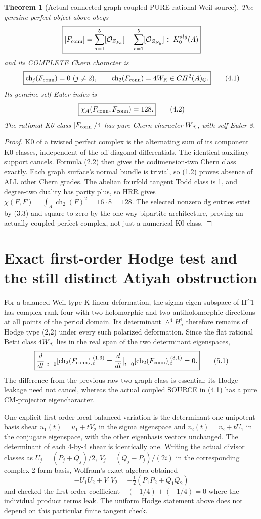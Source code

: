 \documentclass[11pt,a4paper]{article}
\newcommand{\Q}{\mathbb Q}
\newcommand{\ch}{\operatorname{ch}}
\newtheorem{theorem}{Theorem}[section]
\begin{document}
\begin{theorem}[Actual connected graph-coupled PURE rational Weil source]
The genuine perfect object above obeys
\[
 \boxed{
 [F_{\rm conn}]
 =\sum_{a=1}^5[\mathcal O_{Z_{P_a}}]
  -\sum_{b=1}^5[\mathcal O_{Z_{N_b}}]
             \in K_0^{alg}(A)
 }
\]
and its COMPLETE Chern character is
\[
 \boxed{\ch_j(F_{\rm conn})=0\ (j\ne2),\qquad
        \ch_2(F_{\rm conn})=4W_{\rm R}
                   \in CH^2(A)_\Q.}                \tag{4.1}
\]
Its genuine self-Euler index is
\[
 \boxed{\chi_A(F_{\rm conn},F_{\rm conn})=128.}     \tag{4.2}
\]
The rational K0 class \([F_{\rm conn}]/4\)
has pure Chern character \(W_{\rm R}\),
with self-Euler 8.
\end{theorem}
\begin{proof}
K0 of a twisted perfect complex is the alternating
sum of its component K0 classes, independent of
the off-diagonal differentials. The identical
auxiliary support cancels. Formula (2.2) then
gives the codimension-two Chern class exactly.
Each graph surface's normal bundle is trivial,
so (1.2) proves absence of ALL other Chern grades.
The abelian fourfold tangent Todd class is 1,
and degree-two duality has parity plus, so HRR
gives \(\chi(F,F)=\int_A\ch_2(F)^2=16\cdot8=128\).
The selected nonzero dg entries exist by (3.3)
and square to zero by the one-way bipartite
architecture, proving an actually coupled
perfect complex, not just a numerical K0 class.
\end{proof}

\section{Exact first-order Hodge test and the still distinct Atiyah obstruction}
For a balanced Weil-type K-linear deformation,
the sigma-eigen subspace of H^1 has complex
rank four with two holomorphic and two
antiholomorphic directions at all points
of the period domain. Its determinant
\(\wedge^4H^1_\sigma\) therefore remains
of Hodge type (2,2) under every such
polarized deformation. Since the flat rational
Betti class \(4W_{\rm R}\) lies in the real span
of the two determinant eigenspaces,
\[
 \boxed{
  \frac{d}{dt}\big|_{t=0}
  [\ch_2(F_{\rm conn})]^{(1,3)}_t
 =\frac{d}{dt}\big|_{t=0}
  [\ch_2(F_{\rm conn})]^{(3,1)}_t=0.}         \tag{5.1}
\]
The difference from the previous raw two-graph
class is essential: its Hodge leakage need not
cancel, whereas the actual coupled SOURCE in
(4.1) has a pure CM-projector eigencharacter.

One explicit first-order local balanced variation
is the determinant-one unipotent basis shear
\(u_1(t)=u_1+tV_2\) in the sigma eigenspace
and \(v_2(t)=v_2+tU_1\) in the conjugate
eigenspace, with the other eigenbasis
vectors unchanged. The determinant of each
4-by-4 shear is identically one.
Writing the actual divisor classes as
\(U_j=(P_j+Q_j)/2\),
\(V_j=(Q_j-P_j)/(2i)\) in the
corresponding complex 2-form basis,
Wolfram's exact algebra obtained
\[
 -U_1U_2+V_1V_2
   =-\tfrac12(P_1P_2+Q_1Q_2)
\]
and checked the first-order coefficient
\(-(-1/4)+(-1/4)=0\) where the
individual product terms leak.
The uniform Hodge statement above
does not depend on this particular
finite tangent check.
\end{document}
